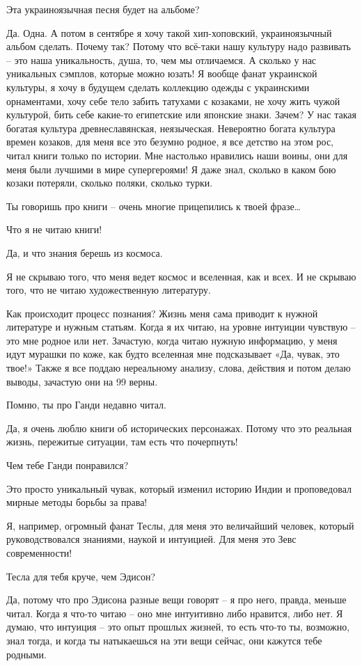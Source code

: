 Эта украиноязычная песня будет на альбоме?

Да. Одна. А потом в сентябре я хочу такой хип-хоповский, украиноязычный альбом
сделать. Почему так? Потому что всё-таки нашу культуру надо развивать – это
наша уникальность, душа,  то, чем мы отличаемся. А сколько у нас уникальных
сэмплов, которые можно юзать! Я вообще фанат украинской культуры, я хочу в
будущем сделать коллекцию одежды с украинскими орнаментами, хочу себе тело
забить татухами с козаками, не хочу жить чужой культурой, бить себе какие-то
египетские или японские знаки. Зачем? У нас такая богатая культура
древнеславянская, неязыческая. Невероятно богата культура времен козаков, для
меня все это безумно родное, я все детство на этом рос, читал книги только по
истории. Мне настолько нравились наши воины, они для меня были лучшими в мире
супергероями! Я даже знал, сколько в каком бою козаки потеряли, сколько поляки,
сколько турки.

Ты говоришь про книги – очень многие прицепились к твоей фразе…

Что я не читаю книги!

Да, и что знания берешь из космоса.

Я не скрываю того, что меня ведет космос и вселенная, как и всех. И не скрываю
того, что не читаю художественную литературу.

Как происходит процесс познания? Жизнь меня сама приводит к нужной литературе и
нужным статьям. Когда я их читаю, на уровне интуиции чувствую – это мне родное
или нет. Зачастую, когда читаю нужную информацию, у меня идут мурашки по коже,
как будто вселенная мне подсказывает «Да, чувак, это твое!» Также я все поддаю
нереальному анализу, слова, действия и потом делаю выводы, зачастую они на 99%
верны.

Помню, ты про Ганди недавно читал.

Да, я очень люблю книги об исторических персонажах. Потому что это реальная
жизнь, пережитые ситуации, там есть что почерпнуть!

Чем тебе Ганди понравился?

Это просто уникальный чувак, который изменил историю Индии и проповедовал
мирные методы борьбы за права!

Я, например, огромный фанат Теслы, для меня это величайший человек, который
руководствовался знаниями, наукой и интуицией. Для меня это Зевс современности!

Тесла для тебя круче, чем Эдисон?

Да, потому что про Эдисона разные вещи говорят – я про него, правда, меньше
читал. Когда я что-то читаю – оно мне интуитивно либо нравится, либо нет. Я
думаю, что интуиция – это опыт прошлых жизней, то есть что-то ты, возможно,
знал тогда, и когда ты натыкаешься на эти вещи сейчас, они кажутся тебе
родными.

